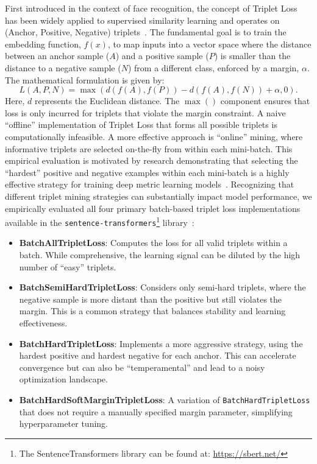First introduced in the context of face recognition, the concept of Triplet Loss has been widely applied to supervised similarity learning and operates on (Anchor, Positive, Negative) triplets~\cite{Yu2020}. The fundamental goal is to train the embedding function, \(f(x)\), to map inputs into a vector space where the distance between an anchor sample (\(A\)) and a positive sample (\(P\)) is smaller than the distance to a negative sample (\(N\)) from a different class, enforced by a margin, \(\alpha\). The mathematical formulation is given by:
\[ L(A,P,N)=\max(d(f(A),f(P))-d(f(A),f(N))+\alpha,0). \]
Here, \(d\) represents the Euclidean distance. The \(\max()\) component ensures that loss is only incurred for triplets that violate the margin constraint. A naive ``offline'' implementation of Triplet Loss that forms all possible triplets is computationally infeasible. A more effective approach is ``online'' mining, where informative triplets are selected on-the-fly from within each mini-batch. This empirical evaluation is motivated by research demonstrating that selecting the ``hardest'' positive and negative examples within each mini-batch is a highly effective strategy for training deep metric learning models~\cite{hermans2017defensetripletlossperson}.  Recognizing that different triplet mining strategies can substantially impact model performance, we empirically evaluated all four primary batch-based triplet loss implementations available in the \verb|sentence-transformers|\footnote{The SentenceTransformers library can be found at: \url{https://sbert.net/}} library~\cite{reimers-2019-sentence-bert}:
\begin{itemize}
    \item \textbf{BatchAllTripletLoss}: Computes the loss for all valid triplets within a batch. While comprehensive, the learning signal can be diluted by the high number of ``easy'' triplets.
    \item \textbf{BatchSemiHardTripletLoss}: Considers only semi-hard triplets, where the negative sample is more distant than the positive but still violates the margin. This is a common strategy that balances stability and learning effectiveness.
    \item \textbf{BatchHardTripletLoss}: Implements a more aggressive strategy, using the hardest positive and hardest negative for each anchor. This can accelerate convergence but can also be ``temperamental'' and lead to a noisy optimization landscape.
    \item \textbf{BatchHardSoftMarginTripletLoss}: A variation of \verb|BatchHardTripletLoss| that does not require a manually specified margin parameter, simplifying hyperparameter tuning.
\end{itemize}

